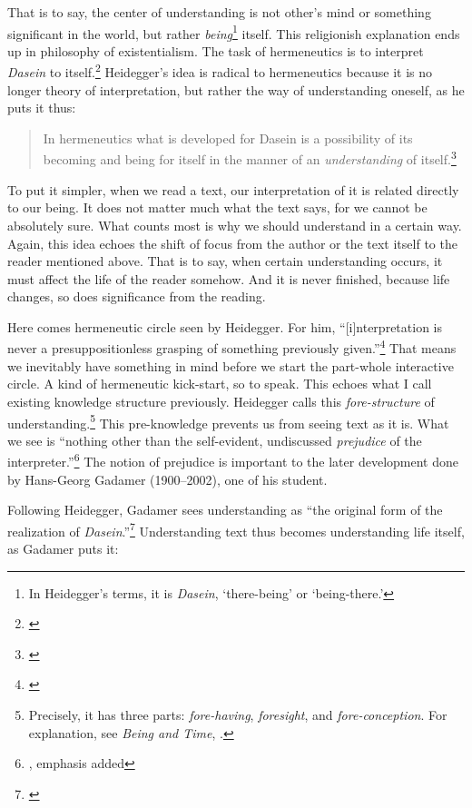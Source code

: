 That is to say, the center of understanding is not other's mind or something significant in the world, but rather \emph{being}\footnote{In Heidegger's terms, it is \emph{Dasein}, `there-being' or `being-there.'} itself. This religionish explanation ends up in philosophy of existentialism. The task of hermeneutics is to interpret \emph{Dasein} to itself.\footnote{\citealp[p.~55]{schmidt:hermeneutics}} Heidegger's idea is radical to hermeneutics because it is no longer theory of interpretation, but rather the way of understanding oneself, as he puts it thus:

\begin{quote}
In hermeneutics what is developed for Dasein is a possibility of its becoming and being for itself in the manner of an \emph{understanding} of itself.\footnote{\citealp[p.~11]{heidegger:ontology}}
\end{quote}

To put it simpler, when we read a text, our interpretation of it is related directly to our being. It does not matter much what the text says, for we cannot be absolutely sure. What counts most is why we should understand in a certain way. Again, this idea echoes the shift of focus from the author or the text itself to the reader mentioned above. That is to say, when certain understanding occurs, it must affect the life of the reader somehow. And it is never finished, because life changes, so does significance from the reading.

Here comes hermeneutic circle seen by Heidegger. For him, ``[i]nterpretation is never a presuppositionless grasping of something previously given.''\footnote{\citealp[p.~146]{heidegger:being}} That means we inevitably have something in mind before we start the part-whole interactive circle. A kind of hermeneutic kick-start, so to speak. This echoes what I call existing knowledge structure previously. Heidegger calls this \emph{fore-structure} of understanding.\footnote{Precisely, it has three parts: \emph{fore-having}, \emph{foresight}, and \emph{fore-conception}. For explanation, see \emph{Being and Time}, \citealp[pp.~145--6]{heidegger:being}.} This pre-knowledge prevents us from seeing text as it is. What we see is ``nothing other than the self-evident, undiscussed \emph{prejudice} of the interpreter.''\footnote{\citealp[p.~146]{heidegger:being}, emphasis added} The notion of prejudice is important to the later development done by Hans-Georg Gadamer (1900--2002), one of his student.

Following Heidegger, Gadamer sees understanding as ``the original form of the realization of \emph{Dasein}.''\footnote{\citealp[p.~250]{gadamer:truth}} Understanding text thus becomes understanding life itself, as Gadamer puts it:

